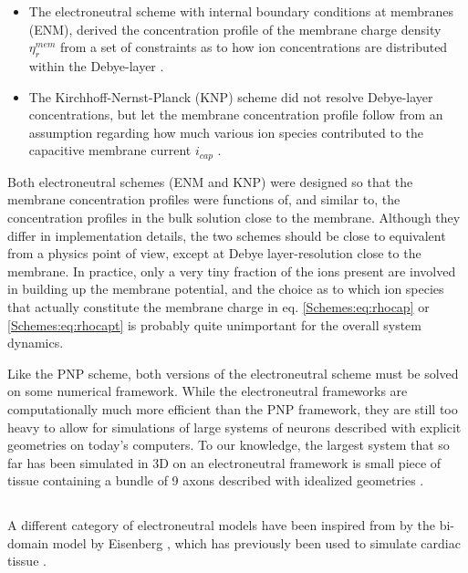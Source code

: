 \begin{itemize}
\item The electroneutral scheme with internal boundary conditions at membranes (ENM), derived the concentration profile of the membrane charge density $\eta_{r}^{mem}$ from a set of constraints as to how ion concentrations are distributed within the Debye-layer \cite{Mori2006, Mori2009, Pods2017}.

\item The Kirchhoff-Nernst-Planck (KNP) scheme did not resolve Debye-layer concentrations, but let the membrane concentration profile follow from an assumption regarding how much various ion species contributed to the capacitive membrane current $i_{cap}$ \cite{ellingsrud2020}.
\end{itemize}

Both electroneutral schemes (ENM and KNP) were designed so that the membrane concentration profiles were functions of, and similar to, the concentration profiles in the bulk solution close to the membrane. Although they differ in implementation details, the two schemes should be close to equivalent from a physics point of view, except at Debye layer-resolution close to the membrane.  In practice, only a very tiny fraction of the ions present are involved in building up the membrane potential, and the choice as to which ion species that actually constitute the membrane charge in eq. \ref{Schemes:eq:rhocap} or \ref{Schemes:eq:rhocapt} is probably quite unimportant for the overall system dynamics.

Like the PNP scheme, both versions of the electroneutral scheme must be solved on some numerical framework. While the electroneutral frameworks are computationally much more efficient than the PNP framework, they are still too heavy to allow for simulations of large systems of neurons described with explicit geometries on today's computers. To our knowledge, the largest system that so far has been simulated in 3D on an electroneutral framework is small piece of tissue containing a bundle of 9 axons described with idealized geometries \cite{ellingsrud2020}.


\subsection{}
\label{sec:Schemes:domain}
A different category of electroneutral models have been inspired from by the bi-domain model by Eisenberg \cite{eisenberg1970}, which has previously been used to simulate cardiac tissue \cite{henriquez1993, sundnes2006, Mori2008}. 

